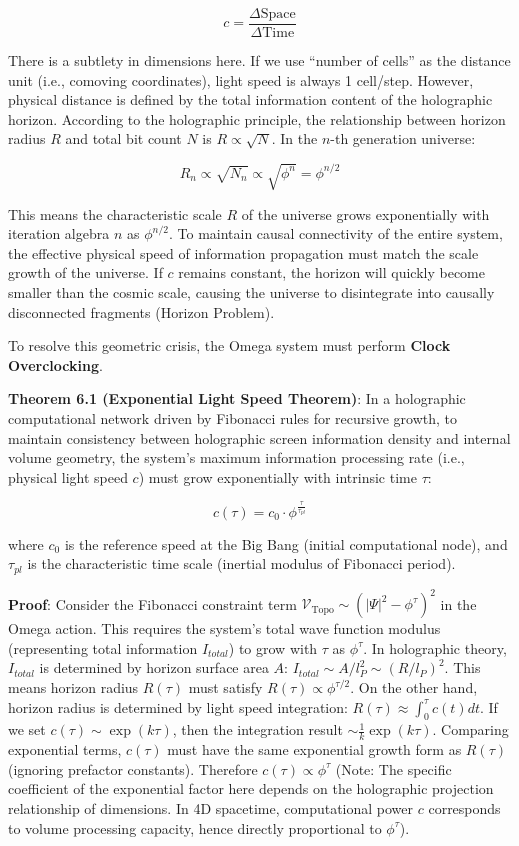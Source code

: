 \[c = \frac{\Delta \text{Space}}{\Delta \text{Time}}\]

There is a subtlety in dimensions here. If we use ``number of cells'' as the distance unit (i.e., comoving coordinates), light speed is always 1 cell/step. However, physical distance is defined by the total information content of the holographic horizon.
According to the holographic principle, the relationship between horizon radius $R$ and total bit count $N$ is $R \propto \sqrt{N}$.
In the $n$-th generation universe:

\[R_n \propto \sqrt{N_n} \propto \sqrt{\phi^n} = \phi^{n/2}\]

This means the characteristic scale $R$ of the universe grows exponentially with iteration algebra $n$ as $\phi^{n/2}$.
To maintain causal connectivity of the entire system, the effective physical speed of information propagation must match the scale growth of the universe. If $c$ remains constant, the horizon will quickly become smaller than the cosmic scale, causing the universe to disintegrate into causally disconnected fragments (Horizon Problem).

To resolve this geometric crisis, the Omega system must perform \textbf{Clock Overclocking}.

\textbf{Theorem 6.1 (Exponential Light Speed Theorem)}:
In a holographic computational network driven by Fibonacci rules for recursive growth, to maintain consistency between holographic screen information density and internal volume geometry, the system's maximum information processing rate (i.e., physical light speed $c$) must grow exponentially with intrinsic time $\tau$:

\[c(\tau) = c_0 \cdot \phi^{\frac{\tau}{\tau_{pl}}}\]

where $c_0$ is the reference speed at the Big Bang (initial computational node), and $\tau_{pl}$ is the characteristic time scale (inertial modulus of Fibonacci period).

\textbf{Proof}:
Consider the Fibonacci constraint term $\mathcal{V}_{\text{Topo}} \sim (|\Psi|^2 - \phi^\tau)^2$ in the Omega action.
This requires the system's total wave function modulus (representing total information $I_{total}$) to grow with $\tau$ as $\phi^\tau$.
In holographic theory, $I_{total}$ is determined by horizon surface area $A$: $I_{total} \sim A/l_P^2 \sim (R/l_P)^2$.
This means horizon radius $R(\tau)$ must satisfy $R(\tau) \propto \phi^{\tau/2}$.
On the other hand, horizon radius is determined by light speed integration: $R(\tau) \approx \int_0^\tau c(t) dt$.
If we set $c(\tau) \sim \exp(k\tau)$, then the integration result $\sim \frac{1}{k}\exp(k\tau)$.
Comparing exponential terms, $c(\tau)$ must have the same exponential growth form as $R(\tau)$ (ignoring prefactor constants).
Therefore $c(\tau) \propto \phi^{\tau}$ (Note: The specific coefficient of the exponential factor here depends on the holographic projection relationship of dimensions. In 4D spacetime, computational power $c$ corresponds to volume processing capacity, hence directly proportional to $\phi^\tau$).

